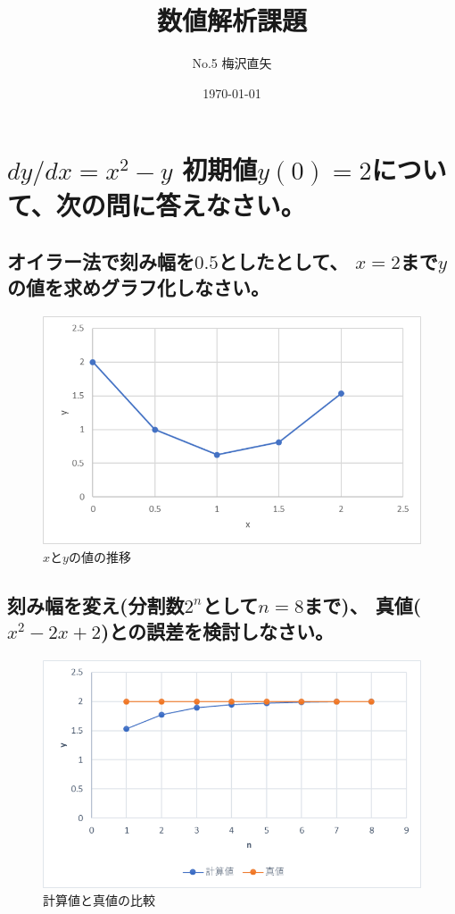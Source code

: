 \documentclass[a4paper,11pt]{jsarticle}
\begin{document}
\title{数値解析課題}
\author{No.5 梅沢直矢}
\date{\today}
\maketitle

\section{$dy/dx=x^2-y$ 初期値$y(0)=2$について、次の問に答えなさい。}

  \subsection{オイラー法で刻み幅を$0.5$としたとして、
              $x=2$まで$y$の値を求めグラフ化しなさい。}

    \begin{figure}[h]
      \centering
      \includegraphics[scale=0.75]{1}
      \caption{$x$と$y$の値の推移}
      \label{fig:1}
    \end{figure}
                        
  \subsection{刻み幅を変え(分割数$2^n$として$n=8$まで)、
              真値($x^2-2x+2$)との誤差を検討しなさい。}
    
    \begin{figure}[h]
      \centering
      \includegraphics[scale=0.75]{2}
      \caption{計算値と真値の比較}
      \label{fig:2}
    \end{figure}
\end{document}
